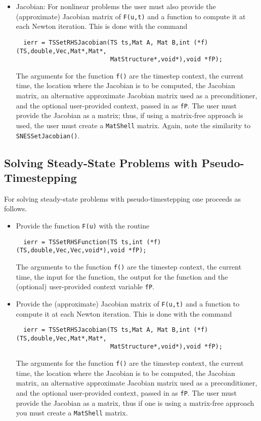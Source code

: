 \begin{itemize}
\item Jacobian: For nonlinear problems the user must also provide the 
(approximate) Jacobian matrix of {\tt F(u,t)} and a function to
compute it at each Newton iteration. This is done with the command
\begin{verbatim}
  ierr = TSSetRHSJacobian(TS ts,Mat A, Mat B,int (*f)(TS,double,Vec,Mat*,Mat*,
                          MatStructure*,void*),void *fP);
\end{verbatim}
The  arguments for the function {\tt f()} are
the timestep context, the current time, the location where the
Jacobian is to be computed, the Jacobian matrix, an alternative
approximate Jacobian matrix used as a preconditioner, and the optional
user-provided context, passed in as {\tt fP}. The user must provide the 
Jacobian as a matrix; thus, if using a matrix-free approach is used, the
user must create a {\tt MatShell} matrix. Again, note the similarity
to {\tt SNESSetJacobian()}. 
\end{itemize}

\subsection{Solving Steady-State Problems with Pseudo-Timestepping}
For solving steady-state problems with pseudo-timestepping one proceeds 
as follows.
\begin{itemize}
\item Provide the function {\tt F(u)} with the routine
\begin{verbatim}
  ierr = TSSetRHSFunction(TS ts,int (*f)(TS,double,Vec,Vec,void*),void *fP);
\end{verbatim}
The  arguments to the function {\tt f()} are
the timestep context, the current time, the input for the function,
the output for the function and the (optional) user-provided context
variable {\tt fP}.

\item Provide the (approximate) Jacobian matrix of {\tt F(u,t)} and a 
function to compute it at each Newton iteration. This is done with the command
\begin{verbatim}
  ierr = TSSetRHSJacobian(TS ts,Mat A, Mat B,int (*f)(TS,double,Vec,Mat*,Mat*,
                          MatStructure*,void*),void *fP);
\end{verbatim}
The  arguments for the function {\tt f()} are
the timestep context, the current time, the location where the
Jacobian is to be computed, the Jacobian matrix, an alternative
approximate Jacobian matrix used as a preconditioner, and the optional
user-provided context, passed in as {\tt fP}. The user must provide the 
Jacobian as a matrix, thus if one is using a matrix-free approach you 
must create a {\tt MatShell} matrix.
\end{itemize}

